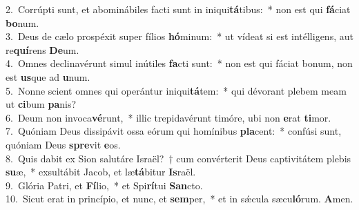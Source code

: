 {2.~}Corrúpti sunt, et abominábiles facti sunt in iniqui\textbf{tá}tibus:~* non est qui \textbf{fá}ciat \textbf{bo}num.\\
{3.~}Deus de cælo prospéxit super fílios \textbf{hó}minum:~* ut vídeat si est intélligens, aut re\textbf{quí}rens \textbf{De}um.\\
{4.~}Omnes declinavérunt simul inútiles \textbf{fa}cti sunt:~* non est qui fáciat bonum, non est \textbf{us}que ad \textbf{u}num.\\
{5.~}Nonne scient omnes qui operántur iniqui\textbf{tá}tem:~* qui dévorant plebem meam ut \textbf{ci}bum \textbf{pa}nis?\\
{6.~}Deum non invoca\textbf{vé}runt,~* illic trepidavérunt timóre, ubi non \textbf{e}rat \textbf{ti}mor.\\
{7.~}Quóniam Deus dissipávit ossa eórum qui homínibus \textbf{pla}cent:~* confúsi sunt, quóniam Deus \textbf{spre}vit \textbf{e}os.\\
{8.~}Quis dabit ex Sion salutáre Israël?~† cum convérterit Deus captivitátem plebis \textbf{su}æ,~* exsultábit Jacob, et læ\textbf{tá}bitur \textbf{Is}raël.\\
{9.~}Glória Patri, et \textbf{Fí}lio,~* et Spi\textbf{rí}tui \textbf{San}cto.\\
{10.~}Sicut erat in princípio, et nunc, et \textbf{sem}per,~* et in sǽcula sæcu\textbf{ló}rum. \textbf{A}men.\\
